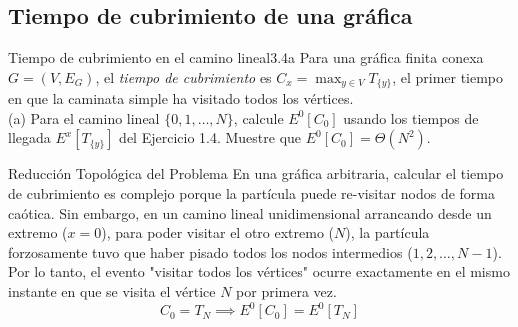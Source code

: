 \documentclass[10pt,a4paper]{article}
\begin{document}
\newpage

\subsection{Tiempo de cubrimiento de una gráfica}


\begin{ejercicio}{Tiempo de cubrimiento en el camino lineal}{3.4a}
    Para una gráfica finita conexa $G = (V, E_G)$, el \textit{tiempo de cubrimiento} es $C_x = \max_{y \in V} T_{\{y\}}$, el primer tiempo en que la caminata simple ha visitado todos los vértices. \\
    (a) Para el camino lineal $\{0,1,\dots,N\}$, calcule $E^0[C_0]$ usando los tiempos de llegada $E^x[T_{\{y\}}]$ del Ejercicio 1.4. Muestre que $E^0[C_0] = \Theta(N^2)$.
\end{ejercicio}

\vspace{2mm}

\begin{nota}{Reducción Topológica del Problema}
    En una gráfica arbitraria, calcular el tiempo de cubrimiento es complejo porque la partícula puede re-visitar nodos de forma caótica. Sin embargo, en un camino lineal unidimensional arrancando desde un extremo ($x=0$), para poder visitar el otro extremo ($N$), la partícula forzosamente tuvo que haber pisado todos los nodos intermedios ($1, 2, \dots, N-1$). 
    Por lo tanto, el evento "visitar todos los vértices" ocurre exactamente en el mismo instante en que se visita el vértice $N$ por primera vez.
    \[ C_0 = T_N \implies E^0[C_0] = E^0[T_N] \]
\end{nota}
\end{document}
